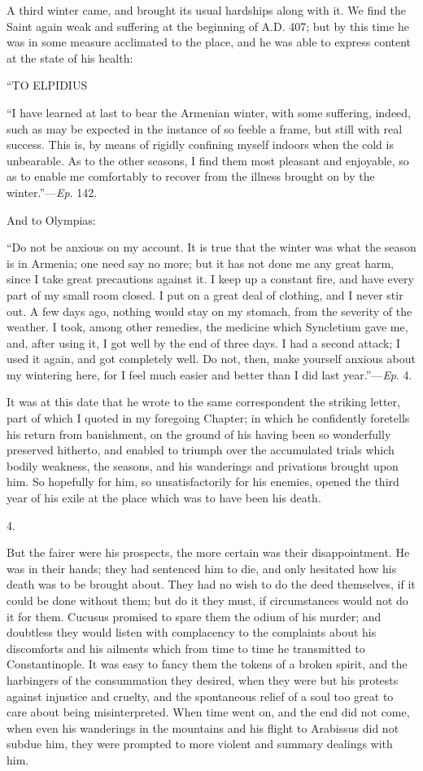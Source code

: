A third winter came, and brought its usual hardships along with it.
We find the Saint again weak and suffering at the beginning of A.D.
407; but by this time he was in some measure acclimated to the place,
and he was able to express content at the state of his health:

``TO
ELPIDIUS

``I have learned at last to bear the Armenian winter, with some
suffering, indeed, such as may be expected in the instance of so
feeble a frame, but still with real success. This is, by means of
rigidly confining myself indoors when the cold is unbearable. As to
the other seasons, I find them most pleasant and enjoyable, so as to
enable me comfortably to recover from the illness brought on by the
winter.''—\emph{Ep}. 142.

And to Olympias:

``Do not be anxious on my account. It is true that the winter
was what the season is in Armenia; one need say no more; but it has
not done me any great harm, since I take great precautions against it.
I keep up a constant fire, and have every part of my small room
closed. I put on a great deal of clothing, and I never stir out. A few
days ago, nothing would stay on my stomach, from the severity of the
weather. I took, among other remedies, the medicine which Syncletium
gave me, and, after using it, I got well by the end of three days. I
had a second attack; I used it again, and got completely well. Do not,
then, make yourself anxious about my wintering here, for I feel much
easier and better than I did last year.''—\emph{Ep}. 4.

It was at this date that he wrote to the same correspondent the
striking letter, part of which I quoted in my foregoing Chapter; in
which he confidently foretells his return from banishment, on the
ground of his having been so wonderfully preserved hitherto, and
enabled to triumph over the accumulated trials which bodily weakness,
the seasons, and his wanderings and privations brought upon him.
So hopefully for him, so unsatisfactorily for his enemies, opened the
third year of his exile at the place which was to have been his death.

4.

But the fairer were his prospects, the more certain was their
disappointment. He was in their hands; they had sentenced him to die,
and only hesitated how his death was to be brought about. They had no
wish to do the deed themselves, if it could be done without them; but
do it they must, if circumstances would not do it for them. Cucusus
promised to spare them the odium of his murder; and doubtless they
would listen with complacency to the complaints about his discomforts
and his ailments which from time to time he transmitted to
Constantinople. It was easy to fancy them the tokens of a broken
spirit, and the harbingers of the consummation they desired, when they
were but his protests against injustice and cruelty, and the
spontaneous relief of a soul too great to care about being
misinterpreted. When time went on, and the end did not come, when even
his wanderings in the mountains and his flight to Arabissus did not
subdue him, they were prompted to more violent and summary dealings
with him.

